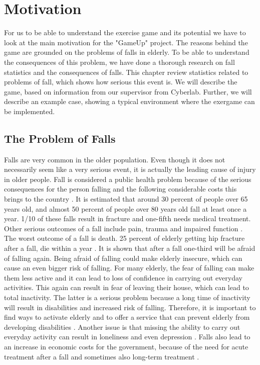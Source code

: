 \chapter{Motivation}
For us to be able to understand the exercise game and its potential we have to look at the main motivation for the "GameUp" project. The reasons behind the game are grounded on the problems of falls in elderly. To be able to understand the consequences of this problem, we have done a thorough research on fall statistics and the consequences of falls. This chapter review statistics related to problems of fall, which shows how serious this event is. We will describe the game, based on information from our supervisor from Cyberlab. Further, we will describe an example case, showing a typical environment where the exergame can be implemented.  
\section{The Problem of Falls}
Falls are very common in the older population. Even though it does not necessarily seem like a very serious event, it is actually the leading cause of injury in older people.  Fall is considered a public health problem because of the serious consequences for the person falling and the following considerable costs this brings to the country \cite{otago}.
It is estimated that around 30 percent of people over 65 years old, and almost 50 percent of people over 80 years old fall at least once a year. 1/10 of these falls result in fracture and one-fifth needs medical treatment. Other serious outcomes of a fall include pain, trauma and impaired function \cite{otago}.  The worst outcome of a fall is death. 25 percent of elderly getting hip fracture after a fall, die within a year \cite{gruppetrening-trheim} \cite{larhalsbrudd}. It is shown that after a fall one-third will be afraid of falling again. Being afraid of falling could make elderly insecure, which can cause an even bigger risk of falling. For many elderly, the fear of falling can make them less active and it can lead to loss of confidence in carrying out everyday activities. This again can result in fear of leaving their house, which can lead to total inactivity. The latter is a serious problem because a long time of inactivity will result in disabilities and increased risk of falling. Therefore, it is important to find ways to activate elderly and to offer a service that can prevent elderly from developing disabilities \cite{gruppetrening-trheim}. Another issue is that missing the ability to carry out everyday activity can result in loneliness and even depression \cite{exergamesforelderly}. Falls also lead to an increase in economic costs for the government, because of the need for acute treatment after a fall and sometimes also long-term treatment \cite{otago}.\\ \\


